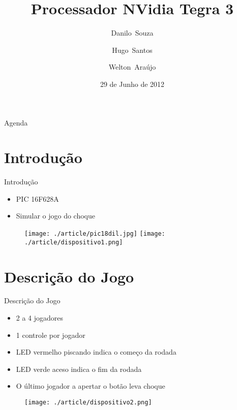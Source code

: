 \documentclass{beamer}
\title[Tegra 3]{%
Processador NVidia Tegra 3%
}
\author[Souza,Santos,Ara\'ujo]{
     Danilo~Souza\and
     Hugo~Santos\and
     Welton~Ara\'ujo
     }
\institute[Bel\'em]{
  \inst{1}%
  Universidade Federal do Par\'a
  }
\date[Bel\ém 2012]{
  29 de Junho de 2012
  }
\begin{document}
\begin{frame}
  \titlepage
\end{frame}

\begin{frame}{Agenda}
  \tableofcontents
\end{frame}

\section{Introdu\c{c}\~ao}
\begin{frame}{Introdu\c{c}\~ao}
  \begin{itemize}
    \item	PIC 16F628A
    \item	Simular o jogo do choque
  \end{itemize}
    \begin{figure}[ht]
      \texttt{[image: ./article/pic18dil.jpg]} \quad
      \texttt{[image: ./article/dispositivo1.png]}
  \end{figure}
\end{frame}

\section{Descri\c{c}\~ao do Jogo}
  \begin{frame}{Descri\c{c}\~ao do Jogo}
	\begin{itemize}
	  \item 	2 a 4 jogadores
	  \item		1 controle por jogador
	  \item		LED vermelho piscando indica o come\c{c}o da rodada
	  \item		LED verde aceso indica o fim da rodada
	  \item		O \'ultimo jogador a apertar o bot\~ao leva choque
	\end{itemize}
	\begin{figure}[ht]
	  \centering
	  \texttt{[image: ./article/dispositivo2.png]}
	\end{figure}
  \end{frame}
   
\end{document}
